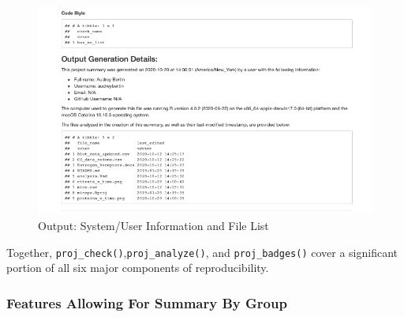 \documentclass[12pt,twoside]{reedthesis}
\begin{document}
\begin{figure}
\includegraphics[width=1\linewidth]{figure/badges-2} \caption{Output: System/User Information and File List}\label{fig:badges-2}
\end{figure}
Together, \texttt{proj\_check()},\texttt{proj\_analyze()}, and \texttt{proj\_badges()} cover a significant portion of all six major components of reproducibility.

\hypertarget{features-allowing-for-summary-by-group}{%
\subsubsection{Features Allowing For Summary By Group}\label{features-allowing-for-summary-by-group}}
\end{document}
